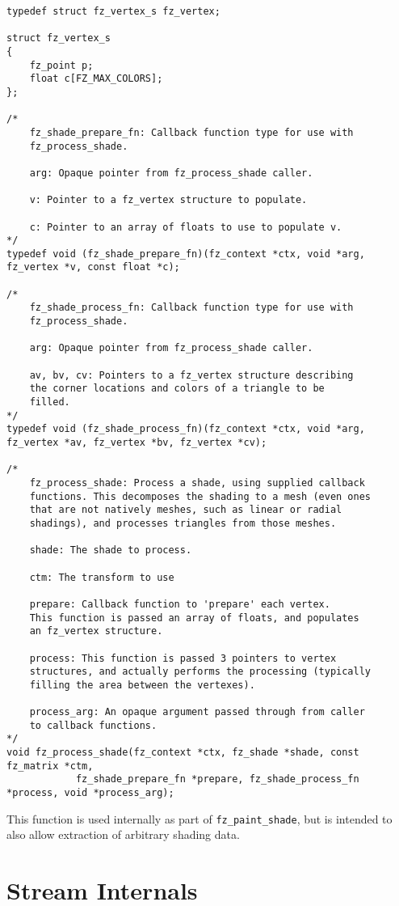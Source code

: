 \documentclass[oneside]{book}
\begin{document}
\begin{lstlisting}
typedef struct fz_vertex_s fz_vertex;

struct fz_vertex_s
{
	fz_point p;
	float c[FZ_MAX_COLORS];
};

/*
	fz_shade_prepare_fn: Callback function type for use with
	fz_process_shade.

	arg: Opaque pointer from fz_process_shade caller.

	v: Pointer to a fz_vertex structure to populate.

	c: Pointer to an array of floats to use to populate v.
*/
typedef void (fz_shade_prepare_fn)(fz_context *ctx, void *arg, fz_vertex *v, const float *c);

/*
	fz_shade_process_fn: Callback function type for use with
	fz_process_shade.

	arg: Opaque pointer from fz_process_shade caller.

	av, bv, cv: Pointers to a fz_vertex structure describing
	the corner locations and colors of a triangle to be
	filled.
*/
typedef void (fz_shade_process_fn)(fz_context *ctx, void *arg, fz_vertex *av, fz_vertex *bv, fz_vertex *cv);

/*
	fz_process_shade: Process a shade, using supplied callback
	functions. This decomposes the shading to a mesh (even ones
	that are not natively meshes, such as linear or radial
	shadings), and processes triangles from those meshes.

	shade: The shade to process.

	ctm: The transform to use

	prepare: Callback function to 'prepare' each vertex.
	This function is passed an array of floats, and populates
	an fz_vertex structure.

	process: This function is passed 3 pointers to vertex
	structures, and actually performs the processing (typically
	filling the area between the vertexes).

	process_arg: An opaque argument passed through from caller
	to callback functions.
*/
void fz_process_shade(fz_context *ctx, fz_shade *shade, const fz_matrix *ctm,
			fz_shade_prepare_fn *prepare, fz_shade_process_fn *process, void *process_arg);
\end{lstlisting}

This function is used internally as part of \texttt{fz\_paint\_shade}, but is intended to also allow extraction of arbitrary shading data.

\chapter{Stream Internals}
\label{Stream Internals}
\end{document}
